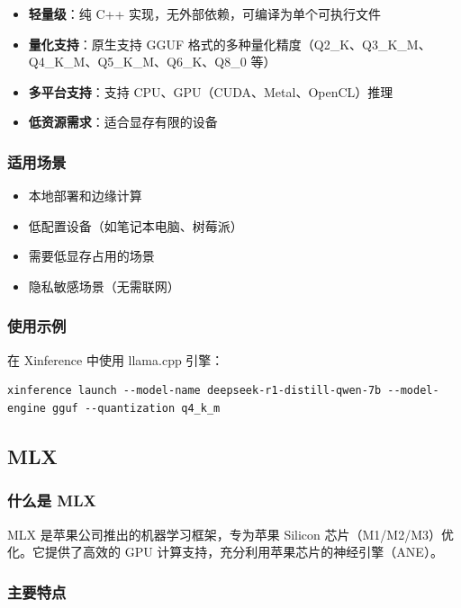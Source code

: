 \documentclass[12pt,UTF8]{ctexbook}
\begin{document}
\begin{itemize}[leftmargin=2cm]
    \item \textbf{轻量级}：纯 C++ 实现，无外部依赖，可编译为单个可执行文件
    \item \textbf{量化支持}：原生支持 GGUF 格式的多种量化精度（Q2\_K、Q3\_K\_M、Q4\_K\_M、Q5\_K\_M、Q6\_K、Q8\_0 等）
    \item \textbf{多平台支持}：支持 CPU、GPU（CUDA、Metal、OpenCL）推理
    \item \textbf{低资源需求}：适合显存有限的设备
\end{itemize}

\subsubsection{适用场景}

\begin{itemize}[leftmargin=2cm]
    \item 本地部署和边缘计算
    \item 低配置设备（如笔记本电脑、树莓派）
    \item 需要低显存占用的场景
    \item 隐私敏感场景（无需联网）
\end{itemize}

\subsubsection{使用示例}

在 Xinference 中使用 llama.cpp 引擎：

\begin{lstlisting}
xinference launch --model-name deepseek-r1-distill-qwen-7b --model-engine gguf --quantization q4_k_m
\end{lstlisting}

\subsection{MLX}
\label{subsec:mlx}

\subsubsection{什么是 MLX}

MLX 是苹果公司推出的机器学习框架，专为苹果 Silicon 芯片（M1/M2/M3）优化。它提供了高效的 GPU 计算支持，充分利用苹果芯片的神经引擎（ANE）。

\subsubsection{主要特点}
\end{document}
